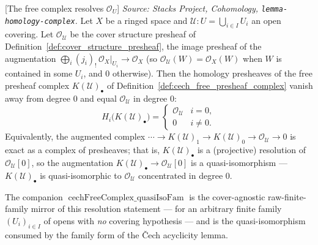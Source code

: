 \begin{lemma}

[The free complex resolves \(\mathcal{O}_U\)]
  \label{lem:cech_free_complex_quasi_iso}
  \textit{Source: Stacks Project, Cohomology,
  \texttt{lemma-homology-complex}.}
  Let \(X\) be a ringed space and \(\mathcal{U} : U = \bigcup_{i \in I} U_i\) an
  open covering. Let \(\mathcal{O}_{\mathcal{U}}\) be the cover structure presheaf of
  Definition~\ref{def:cover_structure_presheaf}, the image presheaf of the
  augmentation \(\bigoplus_i (j_i)_{!}\,\mathcal{O}_X|_{U_i} \to \mathcal{O}_X\) (so
  \(\mathcal{O}_{\mathcal{U}}(W) = \mathcal{O}_X(W)\) when \(W\) is contained in some
  \(U_i\), and \(0\) otherwise). Then the homology
  presheaves of the free presheaf complex
  \(K(\mathcal{U})_\bullet\) of Definition~\ref{def:cech_free_presheaf_complex}
  vanish away from degree \(0\) and equal \(\mathcal{O}_{\mathcal{U}}\) in degree
  \(0\):
  \[
    H_i\bigl(K(\mathcal{U})_\bullet\bigr) =
    \begin{cases}
      \mathcal{O}_{\mathcal{U}} & i = 0, \\
      0 & i \neq 0.
    \end{cases}
  \]
  Equivalently, the augmented complex \(\cdots \to K(\mathcal{U})_1 \to
  K(\mathcal{U})_0 \to \mathcal{O}_{\mathcal{U}} \to 0\) is exact as a complex of
  presheaves; that is, \(K(\mathcal{U})_\bullet\) is a (projective) resolution of
  \(\mathcal{O}_{\mathcal{U}}[0]\), so the augmentation
  \(K(\mathcal{U})_\bullet \to \mathcal{O}_{\mathcal{U}}[0]\) is a
  quasi-isomorphism — \(K(\mathcal{U})_\bullet\) is quasi-isomorphic to
  \(\mathcal{O}_{\mathcal{U}}\) concentrated in degree \(0\).

  The companion \(\operatorname{cechFreeComplex\_quasiIsoFam}\) is the cover-agnostic
  raw-finite-family mirror of this resolution statement — for an arbitrary finite
  family \((U_i)_{i \in I}\) of opens with \emph{no} covering hypothesis — and is the
  quasi-isomorphism consumed by the family form of the {\v C}ech acyclicity lemma.
\end{lemma}

